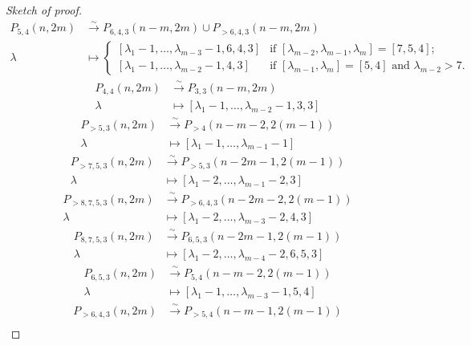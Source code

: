 \documentclass[a4paper, 12pt, reqno]{amsart}
\theoremstyle{remark}
\begin{document}
\begin{proof}[Sketch of proof]
\begin{align*}
    P_{5, 4}(n, 2m) &\xrightarrow{\sim} P_{6, 4, 3}(n - m, 2m) \cup P_{>6, 4, 3}(n - m, 2m) \\
    \lambda &\mapsto
              \begin{cases}
                [\lambda_1 - 1, \dots, \lambda_{m - 3} - 1, 6, 4, 3] &\text{if }[\lambda_{m - 2}, \lambda_{m - 1}, \lambda_m] = [7, 5, 4]; \\
                [\lambda_1 - 1, \dots, \lambda_{m - 2} - 1, 4, 3] &\text{if }[\lambda_{m - 1}, \lambda_m] = [5, 4]\text{ and }\lambda_{m - 2} > 7.
              \end{cases}
  \end{align*}
  \begin{align*}
    P_{4, 4}(n, 2m) &\xrightarrow{\sim} P_{3, 3}(n - m, 2m) \\
    \lambda &\mapsto [\lambda_1 - 1, \dots, \lambda_{m - 2} - 1, 3, 3]
  \end{align*}
  \begin{align*}
    P_{>5, 3}(n, 2m) &\xrightarrow{\sim} P_{>4}(n - m - 2, 2(m - 1)) \\
    \lambda &\mapsto [\lambda_1 - 1, \dots, \lambda_{m - 1} - 1]
  \end{align*}
  \begin{align*}
    P_{>7, 5, 3}(n, 2m) &\xrightarrow{\sim} P_{>5, 3}(n - 2m - 1, 2(m - 1)) \\
    \lambda &\mapsto [\lambda_1 - 2, \dots, \lambda_{m - 1} - 2, 3]
  \end{align*}
  \begin{align*}
    P_{>8, 7, 5, 3}(n, 2m) &\xrightarrow{\sim} P_{>6, 4, 3}(n - 2m - 2, 2(m - 1)) \\
    \lambda &\mapsto [\lambda_1 - 2, \dots, \lambda_{m - 3} - 2, 4, 3]
  \end{align*}
  \begin{align*}
    P_{8, 7, 5, 3}(n, 2m) &\xrightarrow{\sim} P_{6, 5, 3}(n - 2m - 1, 2(m - 1)) \\
    \lambda &\mapsto [\lambda_1 - 2, \dots, \lambda_{m - 4} - 2, 6, 5, 3]
  \end{align*}
  \begin{align*}
    P_{6, 5, 3}(n, 2m) &\xrightarrow{\sim} P_{5, 4}(n - m - 2, 2(m - 1)) \\
    \lambda &\mapsto [\lambda_1 - 1, \dots, \lambda_{m - 3} - 1, 5, 4]
  \end{align*}
  \begin{align*}
    P_{>6, 4, 3}(n, 2m) &\xrightarrow{\sim} P_{>5, 4}(n - m - 1, 2(m - 1)) \\

\end{align*}
\end{proof}
\end{document}
